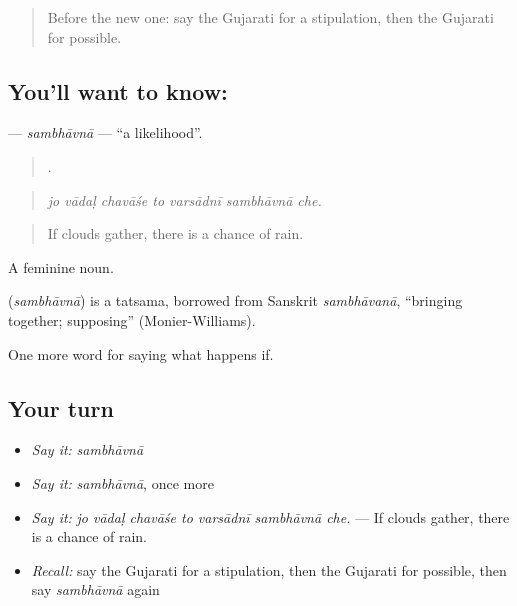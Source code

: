 \begin{quote}
Before the new one: say the Gujarati for a stipulation, then the Gujarati for possible.
\end{quote}

\subsection*{You'll want to know: }
\textbf{} — \emph{sambhāvnā} — \textquotedblleft{}a likelihood\textquotedblright{}.

\begin{quote}
      .
\end{quote}

\begin{quote}
\emph{jo vādaḷ chavāśe to varsādnī sambhāvnā che.}
\end{quote}

\begin{quote}
If clouds gather, there is a chance of rain.
\end{quote}

A feminine noun.

\begin{cousinweb}
\textbf{} (\emph{sambhāvnā}) is a tatsama, borrowed from Sanskrit \emph{sambhāvanā}, \textquotedblleft{}bringing together; supposing\textquotedblright{} (Monier-Williams).
\end{cousinweb}

\begin{grammarlens}[title={What you've built}]
One more word for saying what happens if.
\end{grammarlens}

\subsection*{Your turn}
\begin{itemize}
\raggedright
  \item \emph{Say it:} \emph{sambhāvnā}
  \item \emph{Say it:} \emph{sambhāvnā}, once more
  \item \emph{Say it:} \emph{jo vādaḷ chavāśe to varsādnī sambhāvnā che.} — If clouds gather, there is a chance of rain.
  \item \emph{Recall:} say the Gujarati for a stipulation, then the Gujarati for possible, then say \emph{sambhāvnā} again
\end{itemize}

